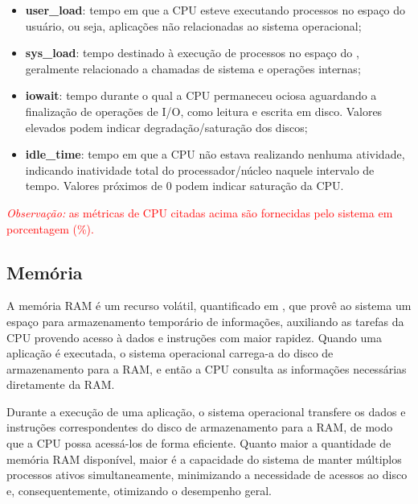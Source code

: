 \begin{itemize}
\item \textbf{user\_load}: tempo em que a CPU esteve executando processos no espaço do usuário, ou seja, aplicações não relacionadas ao sistema operacional;

\item \textbf{sys\_load}: tempo destinado à execução de processos no espaço do , geralmente relacionado a chamadas de sistema e operações internas;

\item \textbf{iowait}: tempo durante o qual a CPU permaneceu ociosa aguardando a finalização de operações de I/O, como leitura e escrita em disco. Valores elevados podem indicar degradação/saturação dos discos;

\item \textbf{idle\_time}: tempo em que a CPU não estava realizando nenhuma atividade, indicando inatividade total do processador/núcleo naquele intervalo de tempo. Valores próximos de 0 podem indicar saturação da CPU.
\end{itemize}

\begin{flushleft}
\footnotesize \textcolor{red}{\textit{Observação:} as métricas de CPU citadas acima são fornecidas pelo sistema em porcentagem (\%).}
\end{flushleft}

\subsection{Memória}
\label{subsection:Memoria}

A memória RAM é um recurso volátil, quantificado em , que provê ao sistema um espaço para armazenamento temporário de informações, auxiliando as tarefas da CPU provendo acesso à dados e instruções com maior rapidez. Quando uma aplicação é executada, o sistema operacional carrega-a do disco de armazenamento para a RAM, e então a CPU consulta as informações necessárias diretamente da RAM. 

Durante a execução de uma aplicação, o sistema operacional transfere os dados e instruções correspondentes do disco de armazenamento para a RAM, de modo que a CPU possa acessá-los de forma eficiente. Quanto maior a quantidade de memória RAM disponível, maior é a capacidade do sistema de manter múltiplos processos ativos simultaneamente, minimizando a necessidade de acessos ao disco e, consequentemente, otimizando o desempenho geral.


